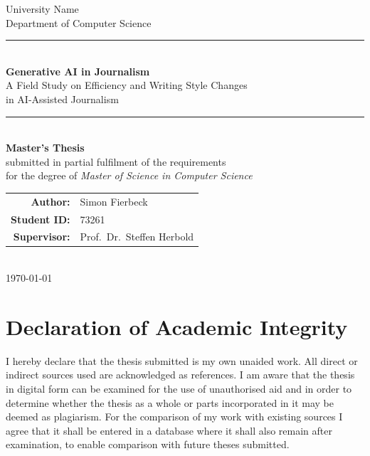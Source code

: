 \documentclass[12pt, a4paper, twoside]{report}
\begin{document}
\begin{titlepage}
  \centering
  \vspace*{1cm}

  {\Large University Name}\\[0.3cm]
  {\large Department of Computer Science}\\[2cm]

  \rule{\linewidth}{0.5mm}\\[0.4cm]
  {\LARGE \bfseries Generative AI in Journalism}\\[0.3cm]
  {\Large A Field Study on Efficiency and Writing Style Changes\\
  in AI-Assisted Journalism}\\[0.4cm]
  \rule{\linewidth}{0.5mm}\\[1.5cm]

  {\large \bfseries Master's Thesis}\\[0.5cm]
  {\normalsize submitted in partial fulfilment of the requirements\\
  for the degree of \textit{Master of Science in Computer Science}}\\[2cm]

  \begin{tabular}{rl}
    \textbf{Author:}     & Simon Fierbeck \\
    \textbf{Student ID:} & 73261 \\[0.5cm]
    \textbf{Supervisor:} & Prof.\ Dr.\ Steffen Herbold \\
  \end{tabular}\\[2cm]

  {\large \today}

  \vfill
\end{titlepage}


\chapter*{Declaration of Academic Integrity}

I hereby declare that the thesis submitted is my own unaided work. All direct
or indirect sources used are acknowledged as references. I am aware that the
thesis in digital form can be examined for the use of unauthorised aid and in
order to determine whether the thesis as a whole or parts incorporated in it may
be deemed as plagiarism. For the comparison of my work with existing sources I
agree that it shall be entered in a database where it shall also remain after
examination, to enable comparison with future theses submitted.
\end{document}
